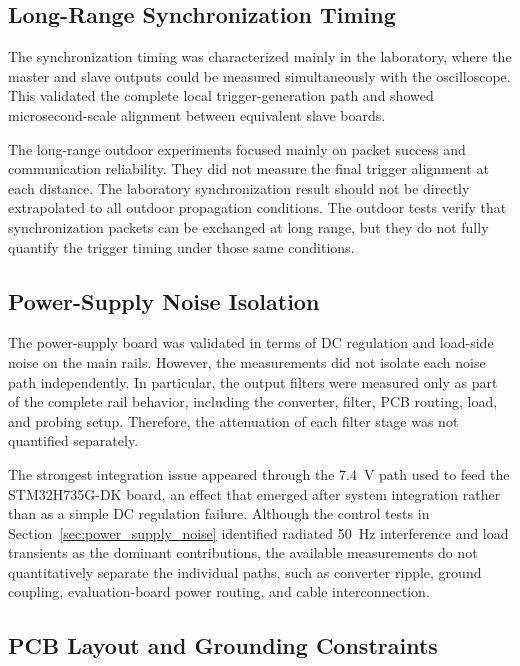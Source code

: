 \subsection{Long-Range Synchronization Timing}

The synchronization timing was characterized mainly in the laboratory, where the master and slave outputs could be measured simultaneously with the oscilloscope. This validated the complete local trigger-generation path and showed microsecond-scale alignment between equivalent slave boards.

The long-range outdoor experiments focused mainly on packet success and communication reliability. They did not measure the final trigger alignment at each distance. The laboratory synchronization result should not be directly extrapolated to all outdoor propagation conditions. The outdoor tests verify that synchronization packets can be exchanged at long range, but they do not fully quantify the trigger timing under those same conditions.

\subsection{Power-Supply Noise Isolation}

The power-supply board was validated in terms of DC regulation and load-side noise on the main rails. However, the measurements did not isolate each noise path independently. In particular, the output filters were measured only as part of the complete rail behavior, including the converter, filter, PCB routing, load, and probing setup. Therefore, the attenuation of each filter stage was not quantified separately.

The strongest integration issue appeared through the 7.4~V path used to feed the STM32H735G-DK board, an effect that emerged after system integration rather than as a simple DC regulation failure. Although the control tests in Section~\ref{sec:power_supply_noise} identified radiated \SI{50}{\hertz} interference and load transients as the dominant contributions, the available measurements do not quantitatively separate the individual paths, such as converter ripple, ground coupling, evaluation-board power routing, and cable interconnection.

\subsection{PCB Layout and Grounding Constraints}

